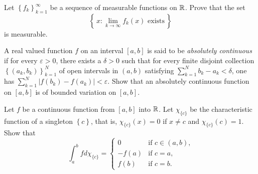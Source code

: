 \begin{problem}
  Let \(\left\{f_k\right\}_{k=1}^\infty\) be a sequence of measurable
  functions on \(\mathbb{R}\). Prove that the set
  \[
    \left\{\,x:\text{\(\lim_{k\to\infty} f_k(x)\) exists}\,\right\}
  \]
  is measurable.
\end{problem}
\begin{solution}
\end{solution}

\begin{problem}
  A real valued function \(f\) on an interval \([a,b]\) is said to be
  \emph{absolutely continuous} if for every \(\varepsilon>0\), there exists
  a \(\delta>0\) such that for every finite disjoint collection
  \(\left\{(a_k,b_k)\right\}_{k=1}^N\) of open intervals in \((a,b)\)
  satisfying \(\sum_{k=1}^Nb_k-a_k<\delta\), one has
  \(\sum_{k=1}^N\left|f(b_k)-f(a_k)\right|<\varepsilon\). Show that an
  absolutely continuous function on \([a,b]\) is of bounded variation on
  \([a,b]\).
\end{problem}
\begin{solution}
\end{solution}

\begin{problem}
  Let \(f\) be a continuous function from \([a,b]\) into \(\mathbb{R}\). Let
  \(\chi_{\{c\}}\) be the characteristic function of a singleton
  \(\left\{c\right\}\), that is, \(\chi_{\{c\}}(x)=0\) if \(x\neq c\) and
  \(\chi_{\{c\}}(c)=1\). Show that
  \[
    \int_a^b f d \chi_{\{c\}}=
    \begin{cases}
      0&\text{if \(c\in(a,b)\),}\\
      -f(a)&\text{if \(c=a\),}\\
      f(b)&\text{if \(c=b\).}
    \end{cases}
  \]
\end{problem}
\begin{solution}
\end{solution}

